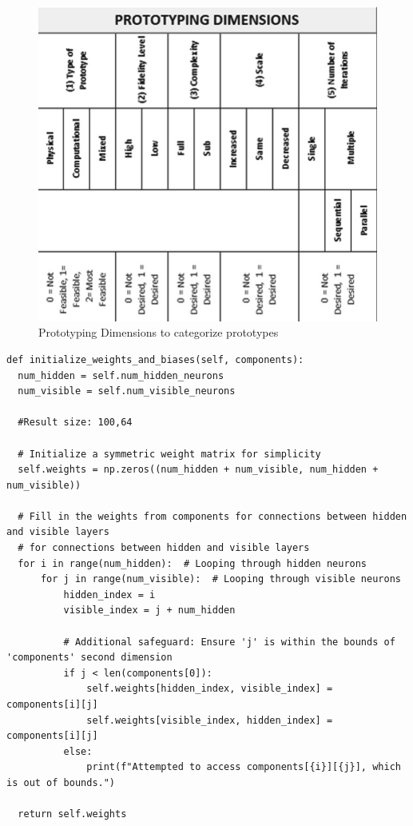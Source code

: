 \label{attachement:prototyping_dimensions}
\begin{figure}[htb]
\centering
\includegraphics[width=0.9\linewidth]{graphics/Prototyping_dimensions.png}
\caption{Prototyping Dimensions to categorize prototypes}
\end{figure}

\label{attachement:weight_matrix}
\begin{lstlisting}
def initialize_weights_and_biases(self, components):
  num_hidden = self.num_hidden_neurons
  num_visible = self.num_visible_neurons

  #Result size: 100,64

  # Initialize a symmetric weight matrix for simplicity
  self.weights = np.zeros((num_hidden + num_visible, num_hidden + num_visible))

  # Fill in the weights from components for connections between hidden and visible layers
  # for connections between hidden and visible layers
  for i in range(num_hidden):  # Looping through hidden neurons
      for j in range(num_visible):  # Looping through visible neurons
          hidden_index = i
          visible_index = j + num_hidden

          # Additional safeguard: Ensure 'j' is within the bounds of 'components' second dimension
          if j < len(components[0]):
              self.weights[hidden_index, visible_index] = components[i][j]
              self.weights[visible_index, hidden_index] = components[i][j]
          else:
              print(f"Attempted to access components[{i}][{j}], which is out of bounds.")

  return self.weights
\end{lstlisting}

